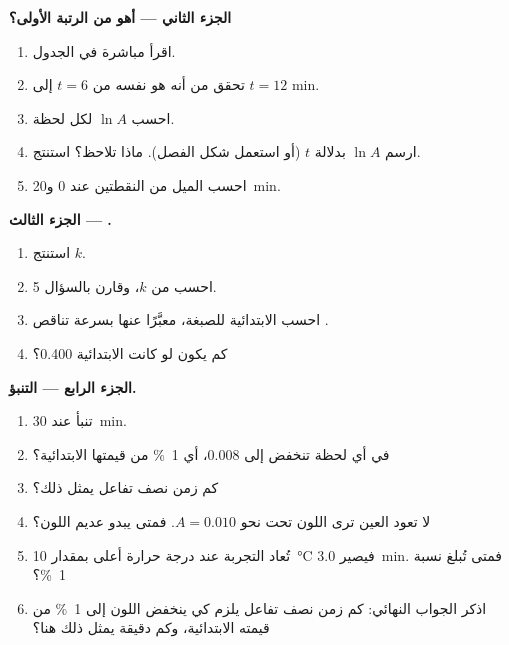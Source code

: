 \begin{problem}
\medskip
\noindent\textbf{الجزء الثاني --- أهو من الرتبة الأولى؟}
\begin{enumerate}[resume]
  \item اقرأ  مباشرة في الجدول.
  \item تحقق من أنه هو نفسه من $t = 6$ إلى $t = 12$ min.
  \item احسب $\ln A$ لكل لحظة.
  \item ارسم $\ln A$ بدلالة $t$ (أو استعمل شكل الفصل). ماذا
        تلاحظ؟ استنتج.
  \item احسب الميل من النقطتين عند 0 و\qty{20}{min}.
\end{enumerate}

\medskip
\noindent\textbf{الجزء الثالث --- .}
\begin{enumerate}[resume]
  \item استنتج $k$.
  \item احسب  من $k$، وقارن بالسؤال 5.
  \item احسب  الابتدائية للصبغة، معبَّرًا عنها
        بسرعة تناقص .
  \item كم يكون  لو كانت  الابتدائية 0.400؟
\end{enumerate}

\medskip
\noindent\textbf{الجزء الرابع --- التنبؤ.}
\begin{enumerate}[resume]
  \item تنبأ  عند \qty{30}{min}.
  \item في أي لحظة تنخفض  إلى 0.008، أي \qty{1}{\percent}
        من قيمتها الابتدائية؟
  \item كم زمن نصف تفاعل يمثل ذلك؟
  \item لا تعود العين ترى اللون تحت نحو $A = 0.010$. فمتى
        يبدو  عديم اللون؟
  \item تُعاد التجربة عند درجة حرارة أعلى بمقدار \qty{10}{\celsius} فيصير
         \qty{3.0}{min}. فمتى تُبلغ نسبة \qty{1}{\percent}؟
  \item اذكر الجواب النهائي: كم زمن نصف تفاعل يلزم كي ينخفض اللون
        إلى \qty{1}{\percent} من قيمته الابتدائية، وكم دقيقة يمثل
        ذلك هنا؟
\end{enumerate}
\end{problem}
